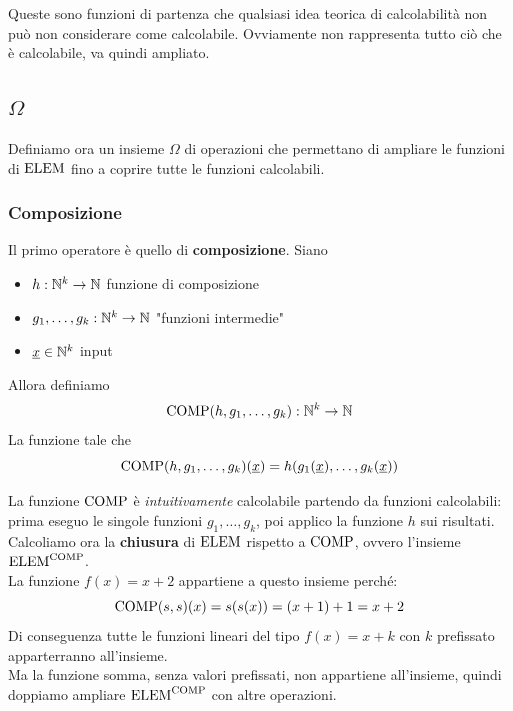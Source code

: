 Queste sono funzioni di partenza che qualsiasi idea teorica di calcolabilità non può non considerare come calcolabile. Ovviamente non rappresenta tutto ciò che è calcolabile, va quindi ampliato.\\

\subsection{$\Omega$}
Definiamo ora un insieme $\Omega$ di operazioni che permettano di ampliare le funzioni di $\text{ELEM}$ fino a coprire tutte le funzioni calcolabili.\\

\subsubsection{Composizione}
Il primo operatore è quello di \textbf{composizione}. Siano
\begin{itemize}
	\item $h: \mathbb{N}^k \rightarrow \mathbb{N}$ funzione di composizione
	\item $g_1, \dots, g_k: \mathbb{N}^k \rightarrow \mathbb{N}$ "funzioni intermedie"
	\item $\underline{x} \in \mathbb{N}^k$ input
\end{itemize}
Allora definiamo 
$$ \text{COMP} (h, g_1, \dots, g_k): \mathbb{N}^k \rightarrow \mathbb{N} $$
La funzione tale che
$$ \text{COMP} (h, g_1, \dots, g_k) (\underline{x}) = h(g_1(\underline{x}), \dots, g_k (\underline{x})) $$

\begin{center}
	
\end{center}

La funzione $\text{COMP}$ è \textit{intuitivamente} calcolabile partendo da funzioni calcolabili: prima eseguo le singole funzioni $g_1, \dots, g_k$, poi applico la funzione $h$ sui risultati.\\

Calcoliamo ora la \textbf{chiusura} di $\text{ELEM}$ rispetto a $\text{COMP}$, ovvero l'insieme $\text{ELEM}^{\text{COMP}}$.\\

La funzione $f(x) = x + 2$ appartiene a questo insieme perché:
$$ \text{COMP}(s,s)(x) = s(s(x)) = (x + 1) + 1 = x + 2 $$
Di conseguenza tutte le funzioni lineari del tipo $f(x) = x + k$ con $k$ prefissato apparterranno all'insieme.\\

Ma la funzione somma, senza valori prefissati, non appartiene all'insieme, quindi doppiamo ampliare $\text{ELEM}^{\text{COMP}}$ con altre operazioni.\\

